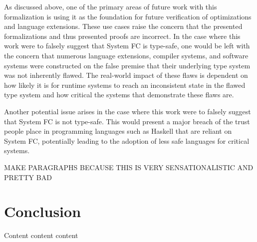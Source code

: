 \documentclass{sig-alternate}
\begin{document}
As discussed above, one of the primary areas of future work with this formalization is using it as the foundation for future verification of optimizations and language extensions. These use cases raise the concern that the presented formalizations and thus presented proofs are incorrect. In the case where this work were to falsely suggest that System FC is type-safe, one would be left with the concern that numerous language extensions, compiler systems, and software systems were constructed on the false premise that their underlying type system was not inherently flawed. The real-world impact of these flaws is dependent on how likely it is for runtime systems to reach an inconsistent state in the flawed type system and how critical the systems that demonstrate these flaws are. 

Another potential issue arises in the case where this work were to falsely suggest that System FC is not type-safe. This would present a major breach of the trust people place in programming languages such as Haskell that are reliant on System FC, potentially leading to the adoption of less safe languages for critical systems.

MAKE PARAGRAPHS BECAUSE THIS IS VERY SENSATIONALISTIC AND PRETTY BAD

\section{Conclusion}
\label{sec:conclusion}

Content content content


\vspace{175pt}
\end{document}
